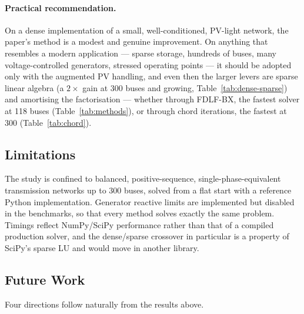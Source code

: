 \documentclass[sigconf,nonacm]{acmart}
\begin{document}
\paragraph{Practical recommendation.}
On a dense implementation of a small, well-conditioned, PV-light network, the
paper's method is a modest and genuine improvement. On anything that resembles a
modern application --- sparse storage, hundreds of buses, many voltage-controlled
generators, stressed operating points --- it should be adopted only with the
augmented PV handling, and even then the larger levers are sparse linear algebra
(a $2\times$ gain at 300 buses and growing, Table~\ref{tab:dense-sparse}) and
amortising the factorisation --- whether through FDLF-BX, the fastest solver at
118 buses (Table~\ref{tab:methods}), or through chord iterations, the fastest at
300 (Table~\ref{tab:chord}).

\subsection{Limitations}
The study is confined to balanced, positive-sequence, single-phase-equivalent
transmission networks up to 300 buses, solved from a flat start with a
reference Python implementation. Generator reactive limits are implemented but
disabled in the benchmarks, so that every method solves exactly the same problem.
Timings reflect NumPy/SciPy performance rather than that of a compiled
production solver, and the dense/sparse crossover in particular is a property of
SciPy's sparse LU and would move in another library.

\subsection{Future Work}
Four directions follow naturally from the results above.
\end{document}
